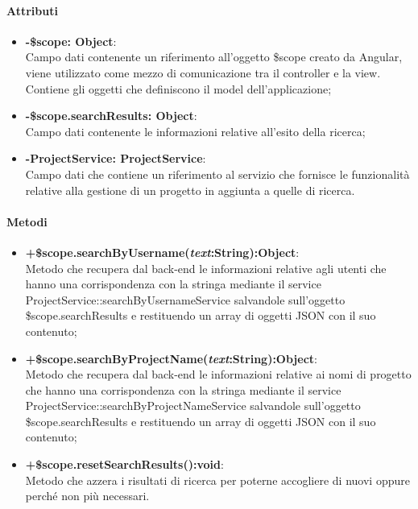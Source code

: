 \paragraph{Attributi}
\begin{itemize}
	\item \textbf{-\$scope: Object}:\\
	Campo dati contenente un riferimento all'oggetto \$scope creato da Angular, viene utilizzato come mezzo di comunicazione tra il controller e la view. Contiene gli oggetti che definiscono il model dell'applicazione;
	\item \textbf{-\$scope.searchResults: Object}:\\
	Campo dati contenente le informazioni relative all'esito della ricerca;
	\item \textbf{-ProjectService: ProjectService}:\\
	Campo dati che contiene un riferimento al servizio che fornisce le funzionalità relative alla gestione di un progetto in aggiunta a quelle di ricerca.
	
\end{itemize}

\paragraph{Metodi}
\begin{itemize}
	\item \textbf{+\$scope.searchByUsername(\textit{text}:String):Object}:\\
	Metodo che recupera dal back-end le informazioni relative agli utenti che hanno una corrispondenza con la stringa mediante il service ProjectService::searchByUsernameService salvandole sull'oggetto \$scope.searchResults e restituendo un array di oggetti JSON con il suo contenuto;
	\item \textbf{+\$scope.searchByProjectName(\textit{text}:String):Object}:\\
	Metodo che recupera dal back-end le informazioni relative ai nomi di progetto che hanno una corrispondenza con la stringa mediante il service ProjectService::searchByProjectNameService salvandole sull'oggetto \$scope.searchResults e restituendo un array di oggetti JSON con il suo contenuto;
	\item \textbf{+\$scope.resetSearchResults():void}:\\
	Metodo che azzera i risultati di ricerca per poterne accogliere di nuovi oppure perché non più necessari.
	
\end{itemize}
